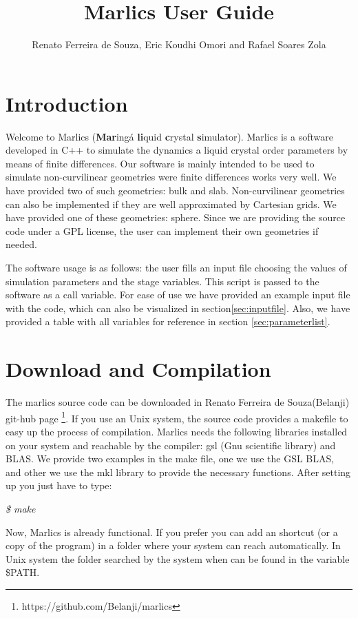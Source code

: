 \documentclass{article}
\title{Marlics User Guide}
\author{Renato Ferreira de Souza, Eric Koudhi Omori and Rafael Soares Zola}
\newcommand{\consoleline}[2][0.5cm]
{\vspace{#1}
\textit{{#2}}
\vspace{#1}
}
\begin{document}
\maketitle

\section{Introduction}
  
Welcome to Marlics (\textbf{Mar}ingá \textbf{li}quid \textbf{c}rystal
\textbf{s}imulator). Marlics is a software developed in C++ to
simulate the dynamics a liquid crystal order parameters by means of
finite differences. Our software is mainly intended to be used to
simulate non-curvilinear geometries were finite differences works very
well. We have provided two of such geometries: bulk and slab.
Non-curvilinear geometries can also be implemented if they are well
approximated by Cartesian grids. We have provided one of these
geometries: sphere.  Since we are providing the source code under a
GPL license, the user can implement their own geometries if needed.

The software usage is as follows: the user fills an input file choosing the
values of simulation parameters and the stage variables. This script
is passed to the software as a call variable. For ease of use we have
provided an example input file with the code, which can also be
visualized in section\ref{sec:inputfile}. Also, we have provided a
table with all variables for reference in section
\ref{sec:parameterlist}.


\section{Download and Compilation}

The marlics source code can be downloaded in Renato Ferreira de
Souza(Belanji) git-hub page
\footnote{https://github.com/Belanji/marlics}. If you use an Unix
system, the source code provides a makefile  to easy up the process of compilation.  Marlics needs
the following libraries installed on your system and reachable by the
compiler: gsl (Gnu scientific library) and BLAS. We provide two
examples in the make file, one we use the GSL BLAS, and other we use
the mkl library to provide the necessary functions.  After setting up
you just have to type:

\consoleline{\$ make}

Now, Marlics is already functional. If you prefer you can add an
shortcut (or a copy of the program) in a folder where your system can
reach automatically. In Unix system the folder searched by the system
when can be found in the variable \$PATH.
\end{document}
